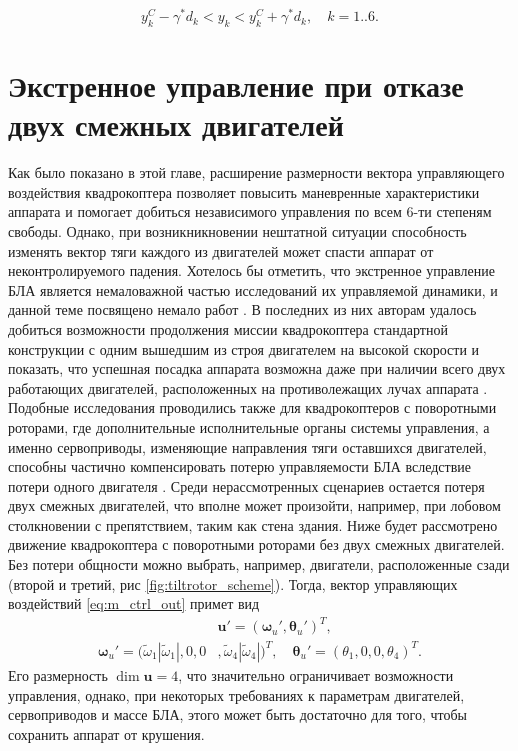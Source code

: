 \begin{equation} \label{eq:lims_final}
y^C_k - \gamma^* d_k < y_k < y^C_k + \gamma^* d_k, \quad k = 1 .. 6.
\end{equation}

\section{Экстренное управление при отказе двух смежных двигателей}
\label{section_em_ctrl}

Как было показано в этой главе, расширение размерности вектора управляющего воздействия квадрокоптера позволяет повысить маневренные характеристики аппарата и помогает добиться независимого управления по всем 6-ти степеням свободы.
Однако, при возникникновении нештатной ситуации способность изменять вектор тяги каждого из двигателей может спасти аппарат от неконтролируемого падения.
Хотелось бы отметить, что экстренное управление БЛА является немаловажной частью исследований их управляемой динамики, и данной теме посвящено немало работ \cite{Morozov01, Lippiello01, Mueller01}. В последних из них авторам удалось добиться возможности продолжения миссии квадрокоптера стандартной конструкции с одним вышедшим из строя двигателем на высокой скорости \cite{Sun01} и показать, что успешная посадка аппарата возможна даже при наличии всего двух работающих двигателей, расположенных на противолежащих лучах аппарата \cite{Gomes01}. Подобные исследования проводились также для квадрокоптеров с поворотными роторами, где дополнительные исполнительные органы системы управления, а именно сервоприводы, изменяющие направления тяги оставшихся двигателей, способны частично компенсировать потерю управляемости БЛА вследствие потери одного двигателя \cite{Nemati02}.
Среди нерассмотренных сценариев остается потеря двух смежных двигателей, что вполне может произойти, например, при лобовом столкновении с препятствием, таким как стена здания. Ниже будет рассмотрено движение квадрокоптера с поворотными роторами без двух смежных двигателей.
Без потери общности можно выбрать, например, двигатели, расположенные сзади (второй и третий, рис \ref{fig:tiltrotor_scheme}). Тогда, вектор управляющих воздействий \eqref{eq:m_ctrl_out} примет вид
\begin{equation} \label{eq:em_ctrl_out}
\begin{aligned}
&\bm{u'} = (\bm \omega_u', \bm \theta_u')^T,
\\
\bm \omega_u' =
(\tilde\omega_1 |\tilde\omega_1|,
0,
0&,
\tilde\omega_4 |\tilde\omega_4|)^T,
\quad
\bm \theta_u' = (\theta_1, 0, 0, \theta_4 )^T.
\end{aligned}
\end{equation}
Его размерность $\dim \bm{u}=4$, что значительно ограничивает возможности управления, однако, при некоторых требованиях к параметрам двигателей, сервоприводов и массе БЛА, этого может быть достаточно для того, чтобы сохранить аппарат от крушения. 

